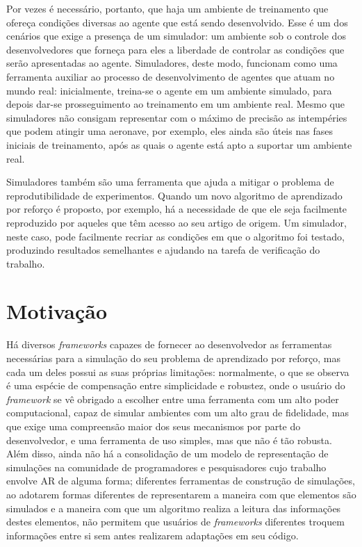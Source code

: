 \documentclass[cic,tc]{iiufrgs}
\begin{document}
Por vezes é necessário, portanto, que haja um ambiente de treinamento que ofereça
condições diversas ao agente que está sendo desenvolvido. Esse é um dos cenários
que exige a presença de um simulador: um ambiente sob o controle dos
desenvolvedores que forneça para eles a liberdade de controlar as condições que
serão apresentadas ao agente. Simuladores, deste modo, funcionam como uma
ferramenta auxiliar ao processo de desenvolvimento de agentes que atuam no mundo
real: inicialmente, treina-se o agente
em um ambiente simulado, para depois dar-se prosseguimento ao treinamento em um
ambiente
real. Mesmo que simuladores não consigam representar com o máximo de precisão
as intempéries que podem atingir uma aeronave, por exemplo, eles ainda são úteis
nas fases iniciais de treinamento, após as quais o agente está apto a suportar
um ambiente real.


Simuladores também são uma ferramenta que ajuda a mitigar o problema de
reprodutibilidade de experimentos. Quando um novo algoritmo de aprendizado
por reforço é proposto, por exemplo, há a necessidade de que ele seja facilmente
reproduzido por aqueles que têm acesso ao seu artigo de origem. Um simulador,
neste caso, pode facilmente recriar as condições em que o algoritmo foi testado,
produzindo resultados semelhantes e ajudando na tarefa de verificação do
trabalho.


\section{Motivação}
Há diversos \textit{frameworks} capazes de fornecer ao desenvolvedor as
ferramentas necessárias para a simulação do seu problema de aprendizado por
reforço, mas cada um deles possui as suas próprias limitações: normalmente, o
que se observa é uma espécie de compensação entre simplicidade e robustez, onde
o usuário do \textit{framework} se vê obrigado a escolher entre uma ferramenta
com um alto poder computacional, capaz de simular ambientes com um alto grau de
fidelidade, mas que exige uma compreensão maior dos seus mecanismos por parte do
desenvolvedor, e uma ferramenta de uso simples, mas que não é tão robusta. Além
disso, ainda não há a consolidação de um modelo de representação de simulações
na comunidade de programadores e pesquisadores cujo trabalho envolve AR de
alguma forma; diferentes ferramentas de construção de simulações, ao adotarem
formas diferentes de representarem a maneira com que elementos são simulados e a
maneira com que um algoritmo realiza a leitura das informações destes elementos,
não permitem que usuários de \textit{frameworks} diferentes troquem informações
entre si sem antes realizarem adaptações em seu código.
\end{document}
